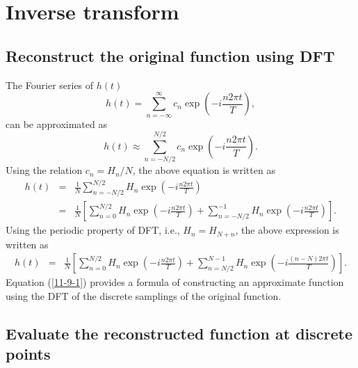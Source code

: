 \documentclass{article}
\begin{document}
\section{Inverse transform}

\subsection{Reconstruct the original function using DFT}

The Fourier series of $h (t)$
\begin{equation}
  h (t) = \sum_{n = - \infty}^{\infty} c_n \exp \left( - i \frac{n 2 \pi t}{T}
  \right),
\end{equation}
can be approximated as
\begin{equation}
  h (t) \approx \sum_{n = - N / 2}^{N / 2} c_n \exp \left( - i \frac{n 2 \pi
  t}{T} \right) .
\end{equation}
Using the relation $c_n = H_n / N$, the above equation is written as
\begin{eqnarray}
  h (t) & = & \frac{1}{N} \sum_{n = - N / 2}^{N / 2} H_n \exp \left( - i
  \frac{n 2 \pi t}{T} \right) \nonumber\\
  & = & \frac{1}{N} \left[ \sum_{n = 0}^{N / 2} H_n \exp \left( - i \frac{n 2
  \pi t}{T} \right) + \sum_{n = - N / 2}^{- 1} H_n \exp \left( - i \frac{n 2
  \pi t}{T} \right) \right] . 
\end{eqnarray}
Using the periodic property of DFT, i.e., $H_n = H_{N + n}$, the above
expression is written as
\begin{eqnarray}
  h (t) & = & \frac{1}{N} \left[ \sum_{n = 0}^{N / 2} H_n \exp \left( - i
  \frac{n 2 \pi t}{T} \right) + \sum_{n = N / 2}^{N - 1} H_n \exp \left( - i
  \frac{(n - N) 2 \pi t}{T} \right) \right] .  \label{11-9-1}
\end{eqnarray}
Equation (\ref{11-9-1}) provides a formula of constructing an approximate
function using the DFT of the discrete samplings of the original function.

\subsection{Evaluate the reconstructed function at discrete points}
\end{document}
